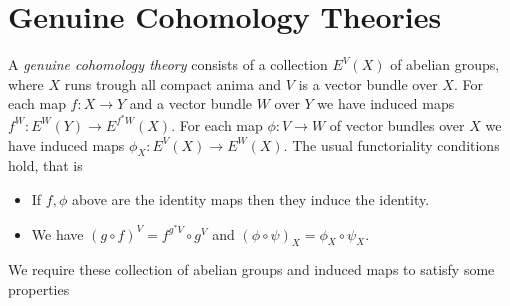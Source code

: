 \section{Genuine Cohomology Theories}\label{section:Genuinecohomologytheories}

\begin{definition}
  
    A \emph{genuine cohomology theory} consists of a collection
  $E^V(X)$ of abelian groups, where $X$ runs trough all compact anima and
  $V$ is a vector bundle over $X$.
  For each map $f \colon X \to Y$ and a vector bundle $W$ over $Y$ we have induced
  maps
  $f^W \colon E^{W}(Y) \to E^{f^*W}(X)$.
  For each map $\phi \colon V \to W$ of vector bundles over $X$ we have
  induced maps
  $\phi_X \colon E^{V}(X) \to E^{W}(X)$.
  The usual functoriality conditions hold, that is
  \begin{itemize}
    \item If $f, \phi$ above are the identity maps then they induce the identity.
    \item We have $(g \circ f)^V = f^{g^*V} \circ g^V$ and
    $(\phi \circ \psi)_X = \phi_X \circ \psi_X$.
  \end{itemize}
  
  We require these collection of abelian groups and induced maps to satisfy some
  properties
  

\end{definition}
